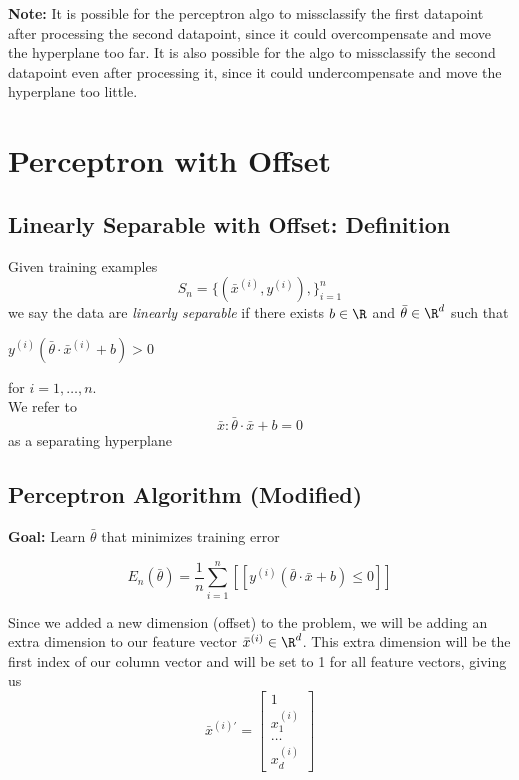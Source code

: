 \documentclass[12pt]{article}
\begin{document}
\textbf{Note:} It is possible for the perceptron algo to missclassify the first datapoint after processing the second datapoint, since it could overcompensate and move the hyperplane too far. It is also possible for the algo to missclassify the second datapoint even after processing it, since it could undercompensate and move the hyperplane too little.

\section{Perceptron with Offset}

\subsection{Linearly Separable with Offset: Definition}

Given training examples 
\[ S_n = \{ (\bar{x}^{(i)}, y^{(i)}), \}_{i=1}^n \]
we say the data are \emph{linearly separable} if there exists $b \in \R$ and $\bar{\theta} \in \R^d$ such that

\begin{center}
	$y^{(i)}(\bar{\theta} \cdot \bar{x}^{(i)} + b) > 0$
\end{center}

for $i = 1, \dots, n$.\\
We refer to 
\[ \bar{x}: \bar{\theta} \cdot \bar{x} + b = 0 \]
as a separating hyperplane

\subsection{Perceptron Algorithm (Modified)}

\textbf{Goal:} Learn $\bar{\theta}$ that minimizes training error

\[ E_n(\bar{\theta}) = \frac 1 n \sum_{i=1}^n [[y^{(i)}(\bar{\theta} \cdot \bar{x} + b) \le 0 ]] \]

Since we added a new dimension (offset) to the problem, we will be adding an extra dimension to our feature vector $\bar{x}^{(i)} \in \R^d$. This extra dimension will be the first index of our column vector and will be set to 1 for all feature vectors, giving us\\

\[ 
	\bar{x}^{(i)'} = 
	\begin{bmatrix}
		1\\
		x_1^{(i)}\\
		\dots\\
		x_d^{(i)}
	\end{bmatrix}
\]
\end{document}
